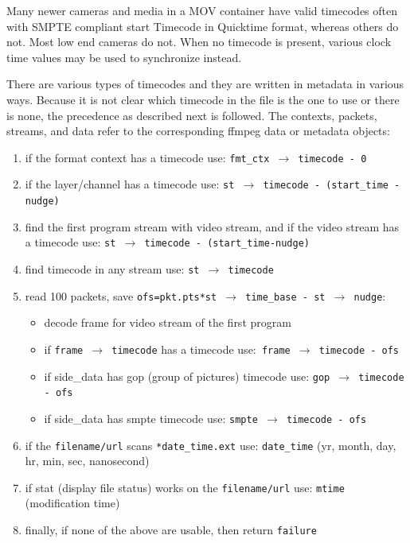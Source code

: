 Many newer cameras and media in a MOV container have valid timecodes often with SMPTE
compliant start Timecode in Quicktime format, whereas others do not. Most low end cameras do not.
When no timecode is present, various clock time values may be used to synchronize instead.

There are various types of timecodes and they are written in metadata in various ways. Because it is not clear which timecode in the file is the one to use or there is none, the precedence as described next is followed. The contexts, packets, streams, and data refer to the corresponding ffmpeg data or metadata objects:

\begin{enumerate}
	\item if the format context has a timecode use: \texttt{fmt\_ctx $\rightarrow$ timecode - 0}
	\item if the layer/channel has a timecode use: \texttt{st $\rightarrow$ timecode - (start\_time -nudge)}
	\item find the first program stream with video stream, and if the video stream has a timecode use:
	\texttt{st $\rightarrow$ timecode - (start\_time-nudge)}
	\item find timecode in any stream use: \texttt{st $\rightarrow$ timecode}
	\item read 100 packets, save \texttt{ofs=pkt.pts*st $\rightarrow$ time\_base - st $\rightarrow$ nudge}:
	\begin{itemize}
		\item decode frame for video stream of the first program
		\item if \texttt{frame $\rightarrow$ timecode} has a timecode use:\texttt{ frame $\rightarrow$ timecode - ofs}
		\item if side\_data has gop (group of pictures) timecode use: \texttt{gop $\rightarrow$ timecode - ofs}
		\item if side\_data has smpte timecode use: \texttt{smpte $\rightarrow$ timecode - ofs}
	\end{itemize}
	\item if the \texttt{filename/url} scans \texttt{*date\_time.ext} use: \texttt{date\_time} (yr, month, day, hr, min, sec, nanosecond)
	\item if stat (display file status) works on the \texttt{filename/url} use: \texttt{mtime} (modification time)
	\item finally, if none of the above are usable, then return \texttt{failure}
\end{enumerate}

